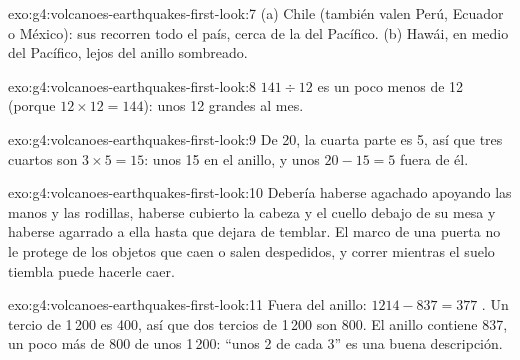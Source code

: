 \begin{solution}{exo:g4:volcanoes-earthquakes-first-look:7}
(a) Chile (también valen Perú, Ecuador o México): sus  recorren todo
el país, cerca de la  del Pacífico. (b) Hawái, en medio del 
Pacífico, lejos del anillo sombreado.
\end{solution}

\begin{solution}{exo:g4:volcanoes-earthquakes-first-look:8}
$141 \div 12$ es un poco menos de 12 (porque $12 \times 12 = 144$): unos
12 grandes  al mes.
\end{solution}

\begin{solution}{exo:g4:volcanoes-earthquakes-first-look:9}
De 20, la cuarta parte es 5, así que tres cuartos son $3 \times 5 = 15$:
unos 15 en el anillo, y unos $20 - 15 = 5$ fuera de él.
\end{solution}

\begin{solution}{exo:g4:volcanoes-earthquakes-first-look:10}
Debería haberse agachado apoyando las manos y las rodillas, haberse
cubierto la cabeza y el cuello debajo de su mesa y haberse agarrado a ella
hasta que dejara de temblar. El marco de una puerta no le protege de los
objetos que caen o salen despedidos, y correr mientras el suelo tiembla
puede hacerle caer.
\end{solution}

\begin{solution}{exo:g4:volcanoes-earthquakes-first-look:11}
Fuera del anillo: $1214 - 837 = 377$ . Un tercio de 1\,200 es 400,
así que dos tercios de 1\,200 son 800. El anillo contiene 837, un poco más
de 800 de unos 1\,200: ``unos 2 de cada 3'' es una buena descripción.
\end{solution}
